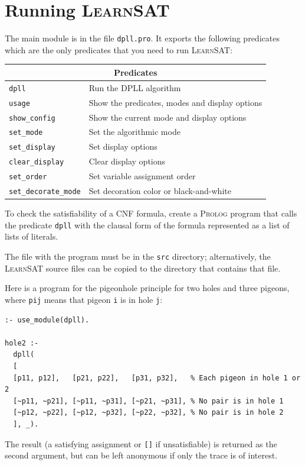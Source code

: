 \documentclass[11pt]{article}
\newcommand*{\p}[1]{\textup{\texttt{#1}}}
\newcommand*{\ls}{\textsc{LearnSAT}}
\newcommand*{\pl}{\textsc{Prolog}}
\begin{document}
\newpage

\section{Running \ls}

The main module is in the file \p{dpll.pro}. It exports the following
predicates which are the only predicates that you need to run \ls{}:

\begin{center}
\begin{tabular}{|l|l|}
\hline
\multicolumn{2}{|c|}{\textbf{\large Predicates}}\\
\hline
\p{dpll}&Run the DPLL algorithm\\
\p{usage}&Show the predicates, modes and display options \\
\p{show\_config}&Show the current mode and display options\\
\p{set\_mode}&Set the algorithmic mode\\
\p{set\_display}&Set display options\\
\p{clear\_display}&Clear display options\\
\p{set\_order}&Set variable assignment order\\
\p{set\_decorate\_mode} & Set decoration color or black-and-white\\ 
\hline
\end{tabular}
\end{center}

To check the satisfiability of a CNF formula, create a \pl{} program
that calls the predicate \p{dpll} with the clausal form of the formula
represented as a list of lists of literals.

The file with the program must be in the \p{src} directory;
alternatively, the \ls{} source files can be copied to the directory
that contains that file.

Here is a program for the pigeonhole principle for two holes and three
pigeons, where \p{pij} means that pigeon \p{i} is in hole \p{j}:

\begin{verbatim}
:- use_module(dpll).

hole2 :-
  dpll(
  [
  [p11, p12],   [p21, p22],   [p31, p32],   % Each pigeon in hole 1 or 2 
  [~p11, ~p21], [~p11, ~p31], [~p21, ~p31], % No pair is in hole 1
  [~p12, ~p22], [~p12, ~p32], [~p22, ~p32], % No pair is in hole 2
  ], _).
\end{verbatim}

The result (a satisfying assignment or \p{[]} if unsatisfiable) is
returned as the second argument, but can be left anonymous if only
the trace is of interest.
\end{document}

